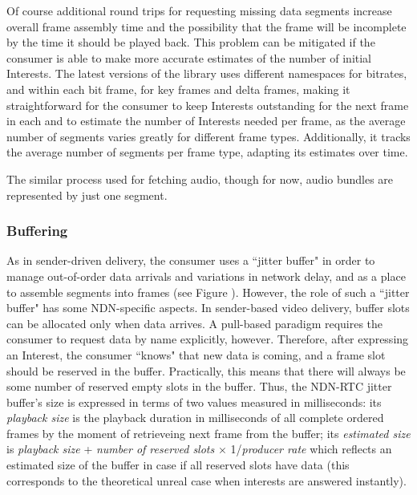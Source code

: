 \documentclass{icn/sig-alternate-2012} %
\newcommand{\ndnrtcName}{NDN-RTC} %
\begin{document}
Of course additional round trips for requesting missing data segments increase overall frame assembly time and the possibility that the frame will be incomplete by the time it should be played back. This problem can be mitigated if the consumer is able to make more accurate estimates of the number of initial Interests. The latest versions of the library uses different namespaces for bitrates, and within each bit frame, for key frames and delta frames, making it straightforward for the consumer to keep Interests outstanding for the next frame in each and to estimate the number of Interests needed per frame, as the average number of segments varies greatly for different frame types. 
Additionally, it tracks the average number of segments per frame type, adapting its estimates over time. 

The similar process used for fetching audio, though for now, audio bundles are represented by just one segment.

\subsubsection{Buffering}


As in sender-driven delivery, the consumer uses a ``jitter buffer" in order to manage out-of-order data arrivals and variations in network delay, and as a place to assemble segments into frames (see Figure \label{fig:old-buf}). However, the role of such a ``jitter buffer"  has some NDN-specific aspects. In sender-based video delivery, buffer slots can be allocated only when data arrives. A pull-based paradigm requires the consumer to request data by name explicitly, however. Therefore, after expressing an Interest, the consumer ``knows" that new data is coming, and a frame slot should be reserved in the buffer. Practically, this means that there will always be some number of reserved empty slots in the buffer. Thus, the \ndnrtcName{} jitter buffer's size is expressed in terms of two values measured in milliseconds: its \textit{playback size} is the playback duration in milliseconds of all complete ordered frames by the moment of retrieveing next frame from the buffer; its \textit{estimated size} is \textit{playback size} + \textit{number of reserved slots} $\times$ 1/\textit{producer rate} which reflects an estimated size of the buffer in case if all reserved slots have data (this corresponds to the theoretical unreal case when interests are answered instantly).
\end{document}
